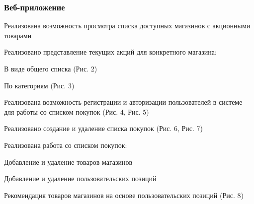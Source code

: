 \subsubsection{Веб-приложение}
\begin{my_enumerate}
  \item Реализована возможность просмотра списка доступных магазинов с
    акционными товарами
  \item Реализовано представление текущих акций для конкретного магазина:
    \begin{my_enumerate}
      \item В виде общего списка (Рис. 2)
      \item По категориям (Рис. 3)
    \end{my_enumerate}
  \item Реализована возможность регистрации и авторизации пользователей в
    системе для работы со списком покупок (Рис. 4, Рис. 5)
  \item Реализовано создание и удаление списка покупок (Рис. 6, Рис. 7)
  \item Реализована работа со списком покупок:
    \begin{my_enumerate}
      \item Добавление и удаление товаров магазинов
      \item Добавление и удаление пользовательских позиций
      \item Рекомендация товаров магазинов на основе пользовательских позиций
        (Рис. 8)
    \end{my_enumerate}
\end{my_enumerate}

